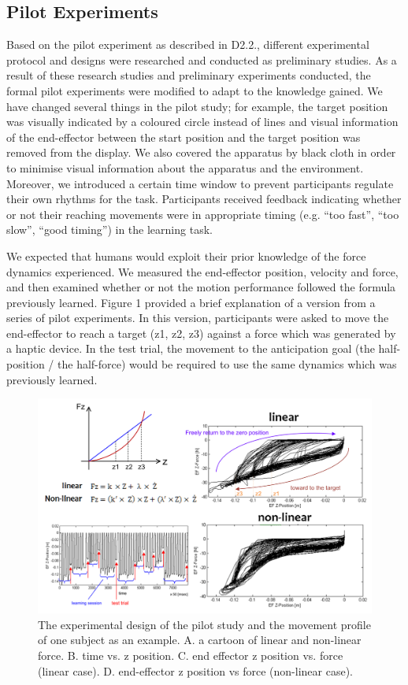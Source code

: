 \subsection{Pilot Experiments}
Based on the pilot experiment as described in D2.2., different experimental protocol and designs were researched and conducted as preliminary studies. As a result of these research studies and preliminary experiments conducted, the formal pilot experiments were modified to adapt to the knowledge gained. We have changed several things in the pilot study; for example, the target position was visually indicated by a coloured circle instead of lines and visual information of the end-effector between the start position and the target position was removed from the display. We also covered the apparatus by black cloth in order to minimise visual information about the apparatus and the environment. Moreover, we introduced a certain time window to prevent participants regulate their own rhythms for the task. Participants received feedback indicating whether or not their reaching movements were in appropriate timing (e.g. “too fast”, “too slow”, “good timing”) in the learning task.

We expected that humans would exploit their prior knowledge of the force dynamics experienced. We measured the end-effector position, velocity and force, and then examined whether or not the motion performance followed the formula previously learned.  Figure 1 provided a brief explanation of a version from a series of pilot experiments. In this version, participants were asked to move the end-effector to reach a target (z1, z2, z3) against a force which was generated by a haptic device. In the test trial, the movement to the anticipation goal (the half-position / the half-force) would be required to use the same dynamics which was previously learned. 
\begin{figure}
  \centering
  \includegraphics[scale=0.4]{Chie/figs/Figure1.png}
  \caption{The experimental design of the pilot study and the movement profile of one subject as an example. A. a cartoon of linear and non-linear force. B. time vs. z position.
C. end effector z position vs. force (linear case). D. end-effector z position vs force (non-linear case).}
  \label{expdesign}
\end{figure}


